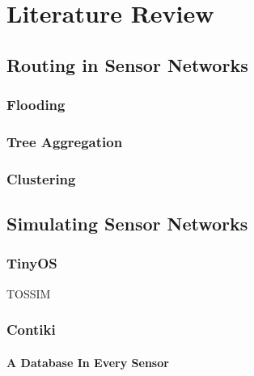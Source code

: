 \section{Literature Review}

\subsection{Routing in Sensor Networks}

\cite{TankBible}

\cite{aggphdfeng} %

\subsubsection{Flooding}

\subsubsection{Tree Aggregation}
\cite{1628365} %

\subsubsection{Clustering}


\subsection{Simulating Sensor Networks}

\subsubsection{TinyOS}

TOSSIM \cite{levis2003tossim}

\subsubsection{Contiki}

\paragraph{A Database In Every Sensor} 
\cite{Tsiftes:2011:DS:2070942.2070974} %
\cite{TinyDB}

